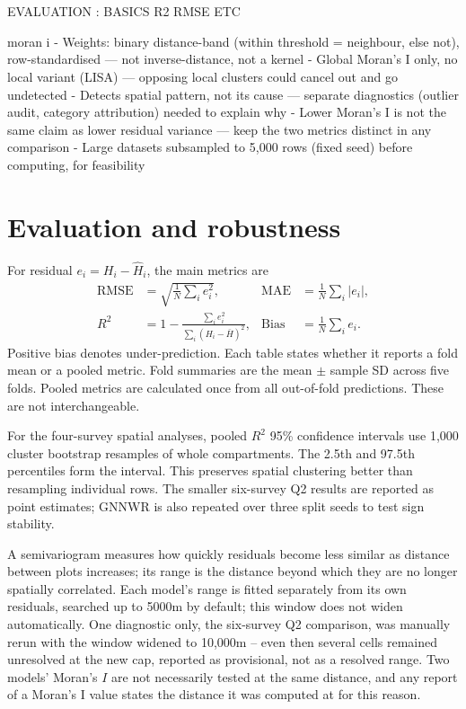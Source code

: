 \documentclass[logo,msc,ai]{infthesis}           %
\begin{document}
\section{}
EVALUATION : BASICS R2 RMSE ETC 

moran i 
  - Weights: binary distance-band (within threshold = neighbour, else not), row-standardised — not inverse-distance, not a kernel
  - Global Moran's I only, no local variant (LISA) — opposing local clusters could cancel out and go undetected
  - Detects spatial pattern, not its cause — separate diagnostics (outlier audit, category attribution) needed to explain why
  - Lower Moran's I is not the same claim as lower residual variance — keep the two metrics distinct in any comparison
  - Large datasets subsampled to 5,000 rows (fixed seed) before computing, for feasibility

\section{Evaluation and robustness}
\label{sec:eval-robustness}

For residual $e_i=H_i-\hat H_i$, the main metrics are
\begin{align}
\mathrm{RMSE}&=\sqrt{\frac{1}{N}\sum_i e_i^2}, &
\mathrm{MAE}&=\frac{1}{N}\sum_i|e_i|, \\
R^2&=1-\frac{\sum_i e_i^2}{\sum_i(H_i-\bar H)^2}, &
\mathrm{Bias}&=\frac{1}{N}\sum_i e_i.
\end{align}
Positive bias denotes under-prediction. Each table states whether it reports a fold mean or a
pooled metric. Fold summaries are the mean $\pm$ sample SD across five folds. Pooled metrics are
calculated once from all out-of-fold predictions. These are not interchangeable.

For the four-survey spatial analyses, pooled $R^2$ 95\% confidence intervals use 1,000 cluster bootstrap resamples of whole compartments. The 2.5th and 97.5th percentiles form the interval. This preserves spatial clustering better than resampling individual rows. The smaller six-survey Q2 results are reported as point estimates; GNNWR is also repeated over three split seeds to test sign stability.

A semivariogram measures how quickly residuals become less similar as distance between plots increases; its range is the distance beyond which they are no longer spatially correlated. Each model's range is fitted separately from its own residuals, searched up to 5000m by default; this window does not widen automatically. One diagnostic only, the six-survey Q2 comparison, was manually rerun with the window widened to 10,000m -- even then several cells remained unresolved at the new cap, reported as provisional, not as a resolved range. Two models' Moran's $I$ are not necessarily tested at the same distance, and any report of a Moran's I value states the distance it was computed at for this reason.
\end{document}
